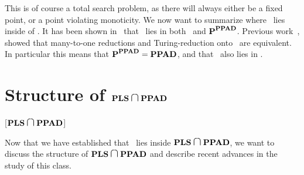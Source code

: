 This is of course a total search problem, as there will always either be a fixed point, or a point violating monoticity.
We now want to summarize where \Tarski\ lies inside of \TFNP{}.
It has been shown in~\cite{etessami_tarskis_2020} that \Tarski\ lies in both \PLS\ and $\textbf{P}^{\textbf{PPAD}}$.
Previous work~, showed that many-to-one reductions and Turing-reduction onto \PPAD\ are equivalent.
In particular this means that $\textbf{P}^{\textbf{PPAD}} = \textbf{PPAD}$, and that \Tarski\ also lies in \PPAD{}.

\section{Structure of \texorpdfstring{$\PLS \medcap \PPAD$}{\PLS\ and \PPAD}}[\texorpdfstring{$\PLS \medcap \PPAD$}{\PLS\ and \PPAD}]

Now that we have established that \Tarski\ lies inside $\PLS \medcap \PPAD$, we want to discuss the structure of $\PLS \medcap \PPAD$ and describe recent advances in the study of this class.
